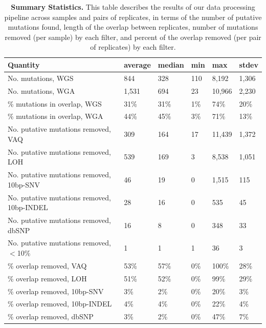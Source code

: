 \documentclass[11pt]{article} %
\begin{document}
\begin{landscape}
\begin{table}
\caption{\textbf{Summary Statistics.} This table describes the results of our data processing pipeline across samples and pairs of replicates, in terms of the number of putative mutations found, length of the overlap between replicates, number of mutations removed (per sample) by each filter, and percent of the overlap removed (per pair of replicates) by each filter.}
\label{tab:summary_stats}
\begin{tabular}{ p{8cm} p{2cm} p{2cm} p{2cm}p{2cm}p{2cm} }
	Quantity & average & median & min & max & stdev \\
	\hline
	No. mutations, WGS & 844 & 328 & 110 & 8,192 & 1,306 \\
	No. mutations, WGA & 1,531 & 694 & 23 & 10,966 & 2,230 \\
	\% mutations in overlap, WGS & 31\% & 31\% & 1\% & 74\% & 20\% \\
	\% mutations in overlap, WGA & 44\% & 45\% & 3\% & 71\% & 13\% \\
	No. putative mutations removed, VAQ & 309 & 164 & 17 & 11,439 & 1,372 \\
	No. putative mutations removed, LOH & 539 & 169 & 3 & 8,538 & 1,051 \\
	No. putative mutations removed, 10bp-SNV & 46 & 19 & 0 & 1,515 & 115 \\
	No. putative mutations removed, 10bp-INDEL & 28 & 16 & 0 & 535 & 45 \\
	No. putative mutations removed, dbSNP & 16 & 8 & 0 & 348 & 33 \\
	No. putative mutations removed, $<$10\% & 1 & 1 & 1 & 36 & 3 \\
	\% overlap removed, VAQ & 53\% & 57\% & 0\% & 100\% & 28\% \\
	\% overlap removed, LOH & 51\% & 52\% & 0\% & 99\% & 29\% \\
	\% overlap removed, 10bp-SNV & 3\% & 2\% & 0\% & 20\% & 3\% \\
	\% overlap removed, 10bp-INDEL & 4\% & 4\% & 0\% & 22\% & 4\% \\
	\% overlap removed, dbSNP & 3\% & 2\% & 0\% & 47\% & 7\% \\
\end{tabular}
\end{table}
\end{landscape}
\end{document}

